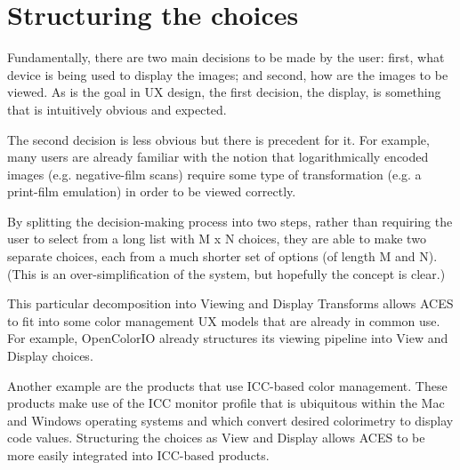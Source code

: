 \numberedformat
\chapter{Structuring the choices}

Fundamentally, there are two main decisions to be made by the user: first, what device is being used to display the images; and second, how are the images to be viewed. As is the goal in UX design, the first decision, the display, is something that is intuitively obvious and expected.

The second decision is less obvious but there is precedent for it. For example, many users are already familiar with the notion that logarithmically encoded images (e.g. negative-film scans) require some type of transformation (e.g. a print-film emulation) in order to be viewed correctly.

By splitting the decision-making process into two steps, rather than requiring the user to select from a long list with M x N choices, they are able to make two separate choices, each from a much shorter set of options (of length M and N). (This is an over-simplification of the system, but hopefully the concept is clear.)

This particular decomposition into Viewing and Display Transforms allows ACES to fit into some color management UX models that are already in common use. For example, OpenColorIO already structures its viewing pipeline into View and Display choices. 

Another example are the products that use ICC-based color management. These products make use of the ICC monitor profile that is ubiquitous within the Mac and Windows operating systems and which convert desired colorimetry to display code values. Structuring the choices as View and Display allows ACES to be more easily integrated into ICC-based products.